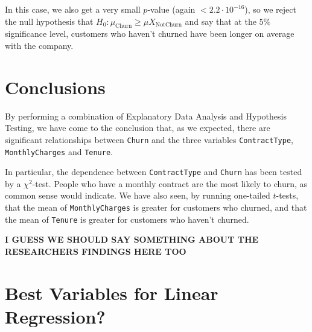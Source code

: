 \documentclass[man, floatsintext]{apa6}
\begin{document}
\hspace{0.5mm}

In this case, we also get a very small $p$-value (again $< 2.2 \cdot 10^{-16}$), so we reject the null hypothesis that  $H_0: \mu_{\text{Churn}} \geq \mu{X}_{\text{NotChurn}}$ and say that at the $5 \%$ significance level, customers who haven't churned have been longer on average with the company.


\section{Conclusions}

By performing a combination of Explanatory Data Analysis and Hypothesis Testing, we have come to the conclusion that, as we expected, there are significant relationships between \texttt{Churn} and the three variables \texttt{ContractType}, \texttt{MonthlyCharges} and \texttt{Tenure}.

In particular, the dependence between \texttt{ContractType} and \texttt{Churn} has been tested by a $\chi^2$-test. People who have a monthly contract are the most likely to churn, as common sense would indicate. We have also seen, by running one-tailed $t$-tests, that the mean of \texttt{MonthlyCharges} is greater for customers who churned, and that the mean of \texttt{Tenure} is greater for customers who haven't churned.

\textbf{I GUESS WE SHOULD SAY SOMETHING ABOUT THE RESEARCHERS FINDINGS HERE TOO}

\appendix
\section{Best Variables for Linear Regression?}
\newpage
\printbibliography
\end{document}
